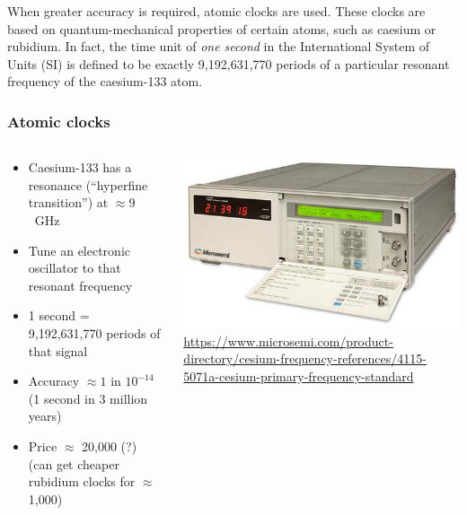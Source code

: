 When greater accuracy is required, atomic clocks are used.
These clocks are based on quantum-mechanical properties of certain atoms, such as caesium or rubidium.
In fact, the time unit of \emph{one second} in the International System of Units (SI) is defined to be exactly 9,192,631,770 periods of a particular resonant frequency of the caesium-133 atom.

\begin{frame}
    \label{s:atomic-clocks}
    \frametitle{Atomic clocks}
    \begin{columns}
        \begin{column}{0.5\textwidth}
            \begin{itemize}
                \item Caesium-133 has a resonance (``hyperfine transition'') at $\approx 9$~GHz
                \item Tune an electronic oscillator to that resonant frequency
                \item 1 second = 9,192,631,770 periods of that signal
                \item Accuracy $\approx 1 \text{ in } 10^{-14}$ (1 second in 3 million years)
                \item Price $\approx$ {\textsterling}20,000 (?)\\ (can get cheaper rubidium clocks for $\approx$ {\textsterling}1,000)
            \end{itemize}
        \end{column}
        \begin{column}{0.5\textwidth}
            \includegraphics[width=\textwidth]{images/atomic-clock.jpg}\\[1em]
            \scriptsize\url{https://www.microsemi.com/product-directory/cesium-frequency-references/4115-5071a-cesium-primary-frequency-standard}
        \end{column}
    \end{columns}
\end{frame}
\label{l:atomic-clocks}

